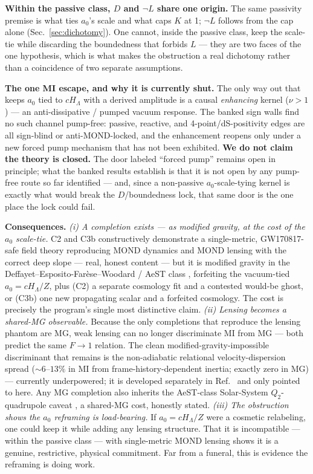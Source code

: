 \documentclass[11pt]{article}
\begin{document}
\textbf{Within the passive class, $D$ and $\lnot L$ share one origin.} The same passivity premise is what ties $a_0$'s scale and what caps $K$ at 1; $\lnot L$ follows from the cap alone (Sec.~\ref{sec:dichotomy}). One cannot, inside the passive class, keep the scale-tie while discarding the boundedness that forbids $L$ --- they are two faces of the one hypothesis, which is what makes the obstruction a real dichotomy rather than a coincidence of two separate assumptions.

\textbf{The one MI escape, and why it is currently shut.} The only way out that keeps $a_0$ tied to $cH_\Lambda$ with a derived amplitude is a causal \emph{enhancing} kernel ($\nu>1$) --- an anti-dissipative / pumped vacuum response. The banked sign walls \cite{zv4,zv11} find no such channel pump-free: passive, reactive, and 4-point/dS-positivity edges are all sign-blind or anti-MOND-locked, and the enhancement reopens only under a new forced pump mechanism that has not been exhibited. \textbf{We do not claim the theory is closed.} The door labeled ``forced pump'' remains open in principle; what the banked results establish is that it is not open by any pump-free route so far identified --- and, since a non-passive $a_0$-scale-tying kernel is exactly what would break the $D$/boundedness lock, that same door is the one place the lock could fail.

\textbf{Consequences.}
\emph{(i) A completion exists --- as modified gravity, at the cost of the $a_0$ scale-tie.} C2 and C3b constructively demonstrate a single-metric, GW170817-safe field theory reproducing MOND dynamics and MOND lensing with the correct deep slope --- real, honest content --- but it is modified gravity in the Deffayet--Esposito-Far\`ese--Woodard / AeST class \cite{dew2011,skordis2021}, forfeiting the vacuum-tied $a_0=cH_\Lambda/Z$, plus (C2) a separate cosmology fit and a contested would-be ghost, or (C3b) one new propagating scalar and a forfeited cosmology. The cost is precisely the program's single most distinctive claim.
\emph{(ii) Lensing becomes a shared-MG observable.} Because the only completions that reproduce the lensing phantom are MG, weak lensing can no longer discriminate MI from MG --- both predict the same $F\to1$ relation. The clean modified-gravity-impossible discriminant that remains is the non-adiabatic relational velocity-dispersion spread (${\sim}6$--$13\%$ in MI from frame-history-dependent inertia; exactly zero in MG) --- currently underpowered; it is developed separately in Ref.~\cite{zsigma} and only pointed to here. Any MG completion also inherits the AeST-class Solar-System $Q_2$-quadrupole caveat \cite{desmond2024,park2026}, a shared-MG cost, honestly stated.
\emph{(iii) The obstruction shows the $a_0$ reframing is load-bearing.} If $a_0=cH_\Lambda/Z$ were a cosmetic relabeling, one could keep it while adding any lensing structure. That it is incompatible --- within the passive class --- with single-metric MOND lensing shows it is a genuine, restrictive, physical commitment. Far from a funeral, this is evidence the reframing is doing work.
\end{document}
